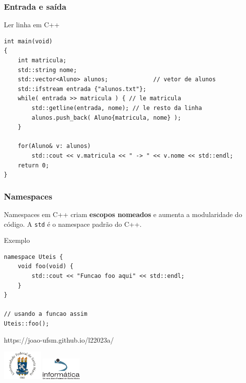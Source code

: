 \documentclass[xcolor={usenames,dvipsnames},10pt,presentation,aspectratio=169]{beamer}
\begin{document}
\begin{frame}[fragile]
  \frametitle{Entrada e saída}
  \begin{block}{Ler linha em C++}
\begin{lstlisting}
int main(void)
{
    int matricula;
    std::string nome;
    std::vector<Aluno> alunos;             // vetor de alunos
    std::ifstream entrada {"alunos.txt"};
    while( entrada >> matricula ) { // le matricula 
        std::getline(entrada, nome); // le resto da linha
        alunos.push_back( Aluno{matricula, nome} );
    }

    for(Aluno& v: alunos)
        std::cout << v.matricula << " -> " << v.nome << std::endl;
    return 0;
}
\end{lstlisting}
  \end{block}
\end{frame}
\begin{frame}[fragile]
  \frametitle{Namespaces}
Namespaces em C++ criam \textbf{escopos nomeados}  e aumenta a modularidade do código.
A \verb+std+ é o namespace padrão do C++.
  \begin{block}{Exemplo}
\begin{lstlisting}
namespace Uteis {
    void foo(void) {
        std::cout << "Funcao foo aqui" << std::endl;
    }
}

// usando a funcao assim
Uteis::foo();
\end{lstlisting}
  \end{block}
\end{frame}
\begin{frame}[plain]{}
  \begin{center}
    \vspace{2cm}
    \Large{https://joao-ufsm.github.io/l22023a/}
    
    \vspace{1cm}
    \includegraphics[width=2cm]{logo_ufsm}
    \hspace{0.5cm}
    \includegraphics[width=2cm]{logo_inf}
  \end{center}
\end{frame}
\end{document}
